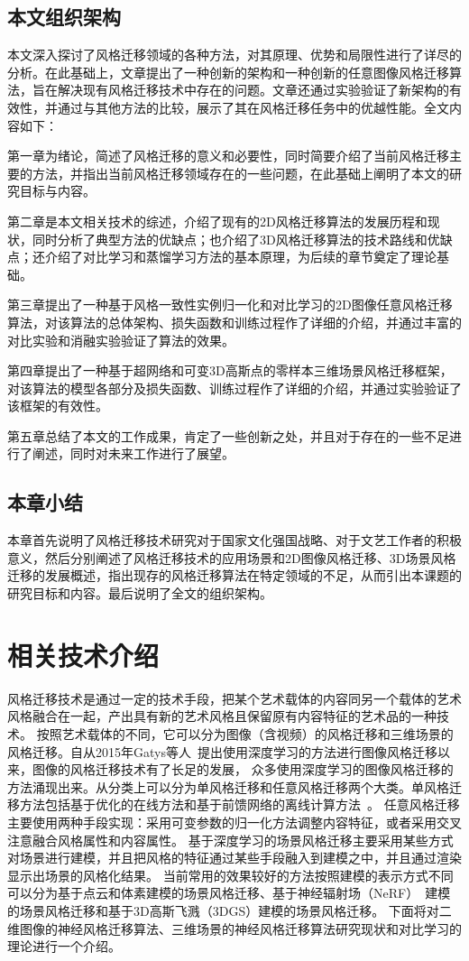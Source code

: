 \section{本文组织架构}
本文深入探讨了风格迁移领域的各种方法，对其原理、优势和局限性进行了详尽的分析。在此基础上，文章提出了一种创新的架构和一种创新的任意图像风格迁移算法，旨在解决现有风格迁移技术中存在的问题。文章还通过实验验证了新架构的有效性，并通过与其他方法的比较，展示了其在风格迁移任务中的优越性能。全文内容如下：
\par 第一章为绪论，简述了风格迁移的意义和必要性，同时简要介绍了当前风格迁移主要的方法，并指出当前风格迁移领域存在的一些问题，在此基础上阐明了本文的研究目标与内容。 
\par 第二章是本文相关技术的综述，介绍了现有的2D风格迁移算法的发展历程和现状，同时分析了典型方法的优缺点；也介绍了3D风格迁移算法的技术路线和优缺点；还介绍了对比学习和蒸馏学习方法的基本原理，为后续的章节奠定了理论基础。
\par 第三章提出了一种基于风格一致性实例归一化和对比学习的2D图像任意风格迁移算法，对该算法的总体架构、损失函数和训练过程作了详细的介绍，并通过丰富的对比实验和消融实验验证了算法的效果。
\par 第四章提出了一种基于超网络和可变3D高斯点的零样本三维场景风格迁移框架，对该算法的模型各部分及损失函数、训练过程作了详细的介绍，并通过实验验证了该框架的有效性。
\par 第五章总结了本文的工作成果，肯定了一些创新之处，并且对于存在的一些不足进行了阐述，同时对未来工作进行了展望。

\section{本章小结}
本章首先说明了风格迁移技术研究对于国家文化强国战略、对于文艺工作者的积极意义，然后分别阐述了风格迁移技术的应用场景和2D图像风格迁移、3D场景风格迁移的发展概述，指出现存的风格迁移算法在特定领域的不足，从而引出本课题的研究目标和内容。最后说明了全文的组织架构。  

\chapter{相关技术介绍}
风格迁移技术是通过一定的技术手段，把某个艺术载体的内容同另一个载体的艺术风格融合在一起，产出具有新的艺术风格且保留原有内容特征的艺术品的一种技术。
按照艺术载体的不同，它可以分为图像（含视频）的风格迁移和三维场景的风格迁移。自从2015年Gatys等人~\cite{gatys2016image}提出使用深度学习的方法进行图像风格迁移以来，图像的风格迁移技术有了长足的发展，
众多使用深度学习的图像风格迁移的方法涌现出来。从分类上可以分为单风格迁移和任意风格迁移两个大类。单风格迁移方法包括基于优化的在线方法和基于前馈网络的离线计算方法~\cite{jing2019neural}。
任意风格迁移主要使用两种手段实现：采用可变参数的归一化方法调整内容特征，或者采用交叉注意融合风格属性和内容属性。
基于深度学习的场景风格迁移主要采用某些方式对场景进行建模，并且把风格的特征通过某些手段融入到建模之中，并且通过渲染显示出场景的风格化结果。
当前常用的效果较好的方法按照建模的表示方式不同可以分为基于点云和体素建模的场景风格迁移、基于神经辐射场（NeRF）~\cite{mildenhall2021nerf}建模的场景风格迁移和基于3D高斯飞溅（3DGS）建模的场景风格迁移。
下面将对二维图像的神经风格迁移算法、三维场景的神经风格迁移算法研究现状和对比学习的理论进行一个介绍。
